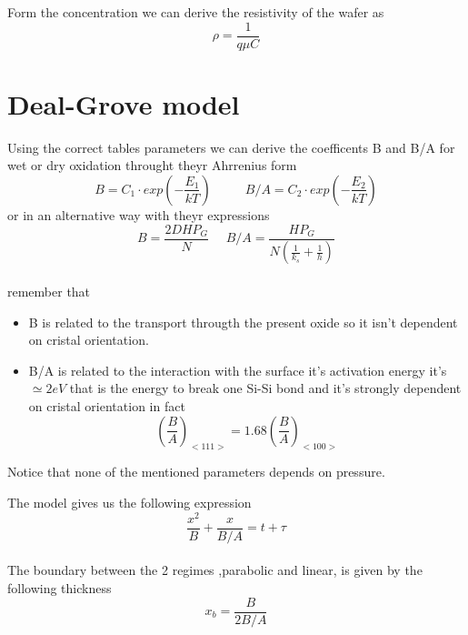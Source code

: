 \vspace{3mm}

Form the concentration we can derive the resistivity of the wafer as
\begin{equation}
\rho=\frac{1}{q\mu C}
\end{equation}


\section{Deal-Grove model}
Using the correct tables parameters we can derive the coefficents B and B/A for wet or dry oxidation throught theyr Ahrrenius form 
\begin{equation}
B=C_1\cdot exp\left(-\frac{E_1}{kT} \right) \ \ \ \ \ \ \ \ \ \ \ \ B/A=C_2\cdot exp\left(-\frac{E_2}{kT} \right)
\end{equation}
or in an alternative way with theyr expressions
\begin{equation}
B=\frac{2DHP_G}{N} \ \ \ \ \ \ B/A=\frac{HP_G}{N \left( \frac{1}{k_s}+\frac{1}{h}  \right) }
\end{equation}
\\
remember that 
\begin{itemize}
\item B is related to the transport througth the present oxide so it isn't dependent on cristal orientation.
\item B/A is related to the interaction with the surface it's activation energy it's $\simeq 2eV$ that is the energy to break one Si-Si bond and it's strongly dependent on cristal orientation in fact
\begin{equation}
\left(\frac{B}{A}\right)_{<111>}=1.68\left(\frac{B}{A}\right)_{<100>}
\end{equation}
\end{itemize}
Notice that none of the mentioned parameters depends on pressure.\\

\vspace{5mm}

The model gives us the following expression
\begin{equation}
\frac{x^2}{B}+\frac{x}{B/A}=t+\tau
\end{equation}
\\
The boundary between the 2 regimes ,parabolic and linear, is given by the following thickness
\begin{equation}
x_b=\frac{B}{2B/A}
\end{equation}
\\
\vspace{5mm}

